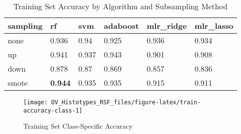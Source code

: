 \documentclass[
]{report}
\begin{document}
\begin{table}

\caption{\label{tab:train-accuracy-table}Training Set Accuracy by Algorithm and Subsampling Method}
\centering
\begin{tabular}[t]{l|l|l|l|l|l}
\hline
sampling & rf & svm & adaboost & mlr\_ridge & mlr\_lasso\\
\hline
none & 0.936 & 0.94 & 0.925 & 0.936 & 0.934\\
\hline
up & 0.941 & 0.937 & 0.943 & 0.901 & 0.908\\
\hline
down & 0.878 & 0.87 & 0.869 & 0.857 & 0.836\\
\hline
smote & \textbf{0.944} & 0.935 & 0.935 & 0.915 & 0.911\\
\hline
\end{tabular}
\end{table}

\begin{figure}[H]

{\centering \texttt{[image: OV\_Histotypes\_RSF\_files/figure-latex/train-accuracy-class-1]} 

}

\caption{Training Set Class-Specific Accuracy}\label{fig:train-accuracy-class}
\end{figure}
\end{document}
